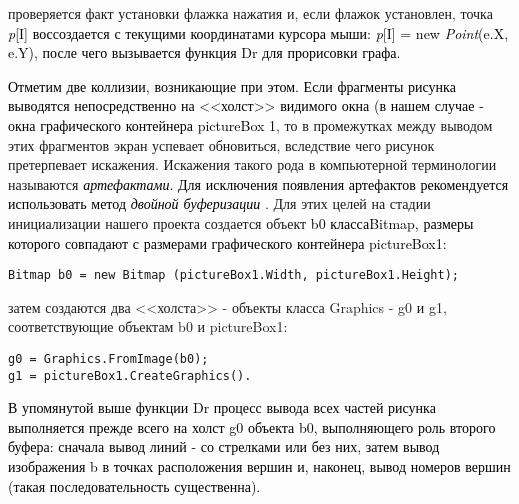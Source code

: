 \noindent проверяется факт установки флажка нажатия и, если флажок установлен, точка
\textit{\textcolor{black}{p}}\textcolor{black}{[I] воссоздается с текущими координатами курсора мыши:
}\textit{\textcolor{black}{p}}\textcolor{black}{[I] = new }\textit{\textcolor{black}{Point}}\textcolor{black}{(e.X,
	e.Y), после чего вызывается функция Dr для прорисовки графа.}

\textcolor{black}{Отметим две коллизии, возникающие при этом. Если фрагменты рисунка выводятся непосредственно на
	<<холст>> видимого окна (в нашем случае - окна графического контейнера
}
\foreignlanguage{english}{\textcolor{black}{pictureBox 1}}, то в промежутках между выводом этих
	фрагментов экран успевает обновиться, вследствие чего рисунок претерпевает искажения. Искажения такого рода в
	компьютерной терминологии называются \textit{\textcolor{black}{артефактами}}\textcolor{black}{. Для исключения
	появления артефактов рекомендуется использовать метод }\textit{\textcolor{black}{двойной
		буферизации}} \cite[C. 264]{AKM_ch5_bib2}. Для этих целей на стадии инициализации нашего проекта создается объект
\foreignlanguage{english}{\textcolor{black}{b}}\textcolor{black}{0 класса}\foreignlanguage{english}{\textcolor{black}{Bitmap}}\textcolor{black}{, размеры которого совпадают с размерами
	графического контейнера }\foreignlanguage{english}{\textcolor{black}{pictureBox}}\textcolor{black}{1:}

\begin{verbatim}
Bitmap b0 = new Bitmap (pictureBox1.Width, pictureBox1.Height);
\end{verbatim}


\noindent затем создаются два <<холста>> - объекты класса Graphics - g0 и g1, соответствующие объектам b0 и
	pictureBox1:

\begin{verbatim}
g0 = Graphics.FromImage(b0);
g1 = pictureBox1.CreateGraphics().
\end{verbatim}

%

\textcolor{black}{В упомянутой выше функции Dr процесс вывода всех частей рисунка выполняется прежде всего на холст g0
	объекта b0, выполняющего роль второго буфера: сначала вывод линий - со стрелками или без них, затем вывод изображения b в точках расположения вершин
	и, наконец, вывод номеров вершин (такая последовательность существенна).}

